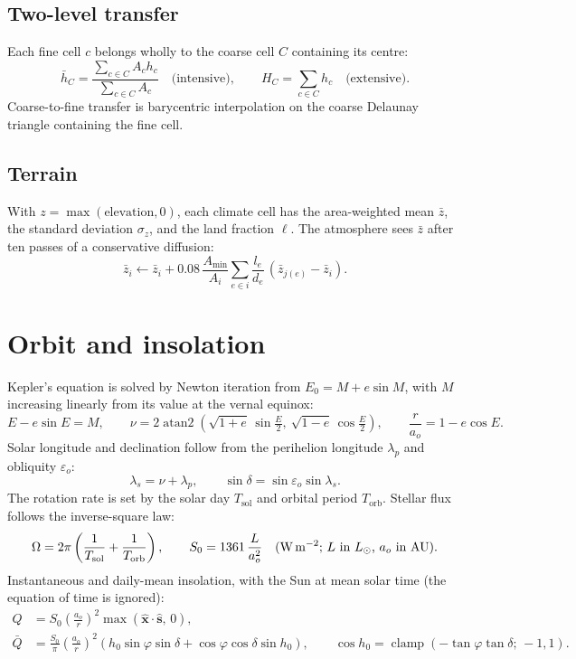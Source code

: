 \documentclass[11pt,a4paper]{article}
\newcommand{\vect}[1]{\bm{#1}}
\newcommand{\clamp}{\operatorname{clamp}}
\begin{document}
\subsection{Two-level transfer}
Each fine cell $c$ belongs wholly to the coarse cell $C$ containing its centre:
\begin{equation}
\bar h_C = \frac{\sum_{c\in C} A_c h_c}{\sum_{c\in C} A_c}
\quad\text{(intensive)}, \qquad
H_C = \sum_{c\in C} h_c \quad\text{(extensive)} .
\end{equation}
Coarse-to-fine transfer is barycentric interpolation on the coarse Delaunay
triangle containing the fine cell.

\subsection{Terrain}
With $z = \max(\text{elevation}, 0)$, each climate cell has the area-weighted mean
$\bar z$, the standard deviation $\sigma_z$, and the land fraction $\ell$. The
atmosphere sees $\bar z$ after ten passes of a conservative diffusion:
\begin{equation}
\bar z_i \leftarrow \bar z_i + 0.08\,\frac{A_{\min}}{A_i}
  \sum_{e\in i} \frac{l_e}{d_e}\,(\bar z_{j(e)} - \bar z_i).
\end{equation}

\section{Orbit and insolation}

Kepler's equation is solved by Newton iteration from $E_0 = M + e\sin M$, with $M$
increasing linearly from its value at the vernal equinox:
\begin{equation}
E - e\sin E = M, \qquad
\nu = 2\operatorname{atan2}\!\left(\sqrt{1+e}\,\sin\tfrac{E}{2},\
      \sqrt{1-e}\,\cos\tfrac{E}{2}\right), \qquad
\frac{r}{a_o} = 1 - e\cos E .
\end{equation}
Solar longitude and declination follow from the perihelion longitude $\lambda_p$
and obliquity $\varepsilon_o$:
\begin{equation}
\lambda_s = \nu + \lambda_p, \qquad
\sin\delta = \sin\varepsilon_o \sin\lambda_s .
\end{equation}
The rotation rate is set by the solar day $T_{\mathrm{sol}}$ and orbital period
$T_{\mathrm{orb}}$. Stellar flux follows the inverse-square law:
\begin{equation}
\Omega = 2\pi\left(\frac{1}{T_{\mathrm{sol}}} + \frac{1}{T_{\mathrm{orb}}}\right), \qquad
S_0 = 1361\,\frac{L}{a_o^2}\quad\text{(W\,m$^{-2}$; $L$ in $L_\odot$, $a_o$ in AU)} .
\end{equation}
Instantaneous and daily-mean insolation, with the Sun at mean solar time (the
equation of time is ignored):
\begin{align}
Q &= S_0\left(\frac{a_o}{r}\right)^{2}\max(\hat{\vect{x}}\cdot\hat{\vect{s}},\,0), \\
\bar Q &= \frac{S_0}{\pi}\left(\frac{a_o}{r}\right)^{2}
  \left(h_0\sin\varphi\sin\delta + \cos\varphi\cos\delta\sin h_0\right), \qquad
\cos h_0 = \clamp(-\tan\varphi\tan\delta;\,-1,1).
\end{align}
\end{document}
